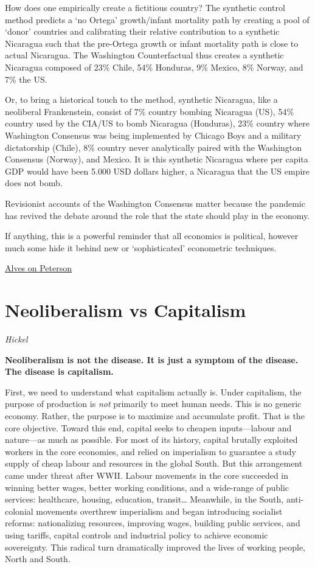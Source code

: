 \documentclass[
]{book}
\begin{document}
How does one empirically create a fictitious country? The synthetic control method predicts a `no Ortega' growth/infant mortality path by creating a pool of `donor' countries and calibrating their relative contribution to a synthetic Nicaragua such that the pre-Ortega growth or infant mortality path is close to actual Nicaragua. The Washington Counterfactual thus creates a synthetic Nicaragua composed of 23\% Chile, 54\% Honduras, 9\% Mexico, 8\% Norway, and 7\% the US.

Or, to bring a historical touch to the method, synthetic Nicaragua, like a neoliberal Frankenstein, consist of 7\% country bombing Nicaragua (US), 54\% country used by the CIA/US to bomb Nicaragua (Honduras), 23\% country where Washington Consensus was being implemented by Chicago Boys and a military dictatorship (Chile), 8\% country never analytically paired with the Washington Consensus (Norway), and Mexico. It is this synthetic Nicaragua where per capita GDP would have been 5.000 USD dollars higher, a Nicaragua that the US empire does not bomb.

Revisionist accounts of the Washington Consensus matter because the pandemic has revived the debate around the role that the state should play in the economy.

If anything, this is a powerful reminder that all economics is political, however much some hide it behind new or `sophisticated' econometric techniques.

\href{https://developingeconomics.org/2021/04/08/the-washington-counterfactual-dont-believe-the-washington-consensus-resurrection/}{Alves on Peterson}

\hypertarget{neoliberalism-vs-capitalism}{%
\section{Neoliberalism vs Capitalism}\label{neoliberalism-vs-capitalism}}

\emph{Hickel}

\textbf{Neoliberalism is not the disease.
It is just a symptom of the disease.
The disease is capitalism.}

First, we need to understand what capitalism actually is. Under capitalism, the purpose of production is \emph{not} primarily to meet human needs. This is no generic economy. Rather, the purpose is to maximize and accumulate profit. That is the core objective.
Toward this end, capital seeks to cheapen inputs---labour and nature---as much as possible. For most of its history, capital brutally exploited workers in the core economies, and relied on imperialism to guarantee a study supply of cheap labour and resources in the global South.
But this arrangement came under threat after WWII. Labour movements in the core succeeded in winning better wages, better working conditions, and a wide-range of public services: healthcare, housing, education, transit\ldots{}
Meanwhile, in the South, anti-colonial movements overthrew imperialism and began introducing socialist reforms: nationalizing resources, improving wages, building public services, and using tariffs, capital controls and industrial policy to achieve economic sovereignty.
This radical turn dramatically improved the lives of working people, North and South.
\end{document}
